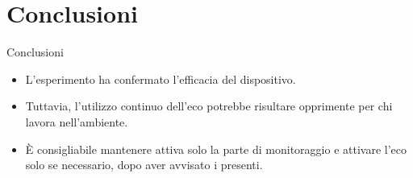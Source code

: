 \documentclass[hidelinks,aspectratio=169]{beamer}
\begin{document}
\section{Conclusioni}
\begin{frame}{Conclusioni}
	\begin{itemize}
		\item L’esperimento ha confermato l’efficacia del dispositivo.
		\item Tuttavia, l’utilizzo continuo dell’eco potrebbe risultare opprimente per chi lavora nell’ambiente.
		\item È consigliabile mantenere attiva solo la parte di monitoraggio e attivare l’eco solo se necessario, dopo aver avvisato i presenti.
	\end{itemize}
\end{frame}
	
\end{document}
